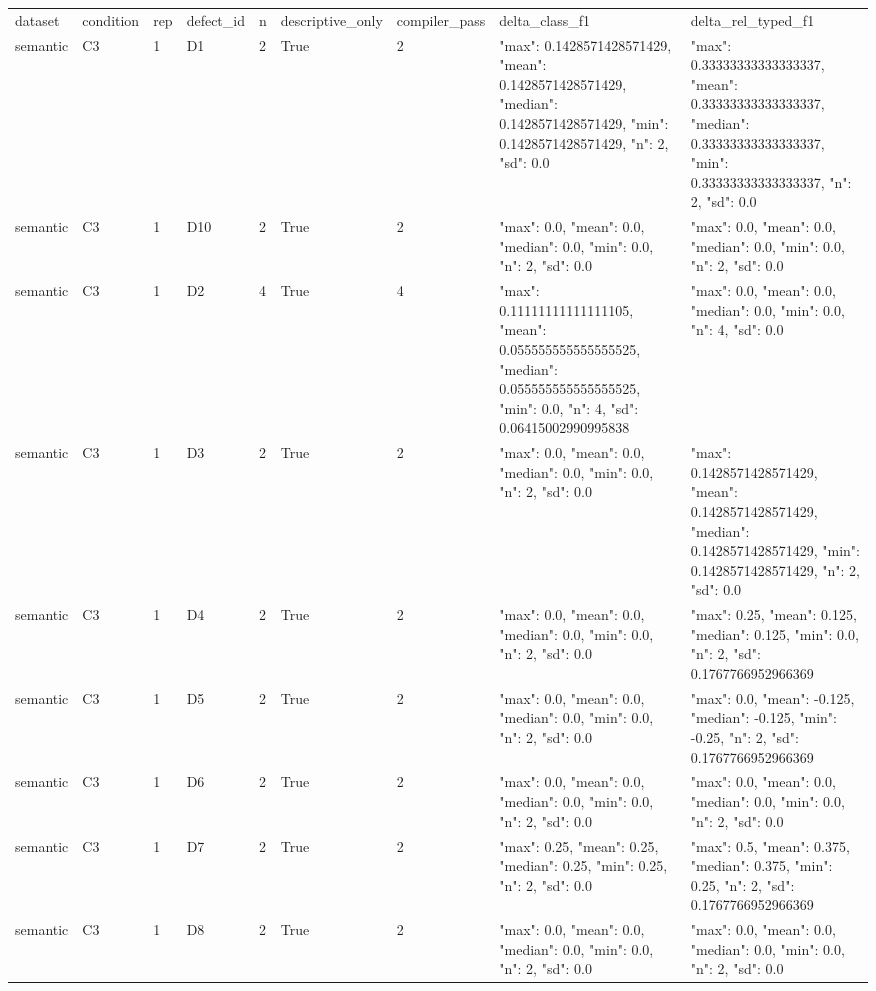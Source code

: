 \begin{tabular}{lllllllll}
dataset & condition & rep & defect\_id & n & descriptive\_only & compiler\_pass & delta\_class\_f1 & delta\_rel\_typed\_f1 \\
semantic & C3 & 1 & D1 & 2 & True & 2 & {"max": 0.1428571428571429, "mean": 0.1428571428571429, "median": 0.1428571428571429, "min": 0.1428571428571429, "n": 2, "sd": 0.0} & {"max": 0.33333333333333337, "mean": 0.33333333333333337, "median": 0.33333333333333337, "min": 0.33333333333333337, "n": 2, "sd": 0.0} \\
semantic & C3 & 1 & D10 & 2 & True & 2 & {"max": 0.0, "mean": 0.0, "median": 0.0, "min": 0.0, "n": 2, "sd": 0.0} & {"max": 0.0, "mean": 0.0, "median": 0.0, "min": 0.0, "n": 2, "sd": 0.0} \\
semantic & C3 & 1 & D2 & 4 & True & 4 & {"max": 0.11111111111111105, "mean": 0.055555555555555525, "median": 0.055555555555555525, "min": 0.0, "n": 4, "sd": 0.06415002990995838} & {"max": 0.0, "mean": 0.0, "median": 0.0, "min": 0.0, "n": 4, "sd": 0.0} \\
semantic & C3 & 1 & D3 & 2 & True & 2 & {"max": 0.0, "mean": 0.0, "median": 0.0, "min": 0.0, "n": 2, "sd": 0.0} & {"max": 0.1428571428571429, "mean": 0.1428571428571429, "median": 0.1428571428571429, "min": 0.1428571428571429, "n": 2, "sd": 0.0} \\
semantic & C3 & 1 & D4 & 2 & True & 2 & {"max": 0.0, "mean": 0.0, "median": 0.0, "min": 0.0, "n": 2, "sd": 0.0} & {"max": 0.25, "mean": 0.125, "median": 0.125, "min": 0.0, "n": 2, "sd": 0.1767766952966369} \\
semantic & C3 & 1 & D5 & 2 & True & 2 & {"max": 0.0, "mean": 0.0, "median": 0.0, "min": 0.0, "n": 2, "sd": 0.0} & {"max": 0.0, "mean": -0.125, "median": -0.125, "min": -0.25, "n": 2, "sd": 0.1767766952966369} \\
semantic & C3 & 1 & D6 & 2 & True & 2 & {"max": 0.0, "mean": 0.0, "median": 0.0, "min": 0.0, "n": 2, "sd": 0.0} & {"max": 0.0, "mean": 0.0, "median": 0.0, "min": 0.0, "n": 2, "sd": 0.0} \\
semantic & C3 & 1 & D7 & 2 & True & 2 & {"max": 0.25, "mean": 0.25, "median": 0.25, "min": 0.25, "n": 2, "sd": 0.0} & {"max": 0.5, "mean": 0.375, "median": 0.375, "min": 0.25, "n": 2, "sd": 0.1767766952966369} \\
semantic & C3 & 1 & D8 & 2 & True & 2 & {"max": 0.0, "mean": 0.0, "median": 0.0, "min": 0.0, "n": 2, "sd": 0.0} & {"max": 0.0, "mean": 0.0, "median": 0.0, "min": 0.0, "n": 2, "sd": 0.0} \\

\end{tabular}
